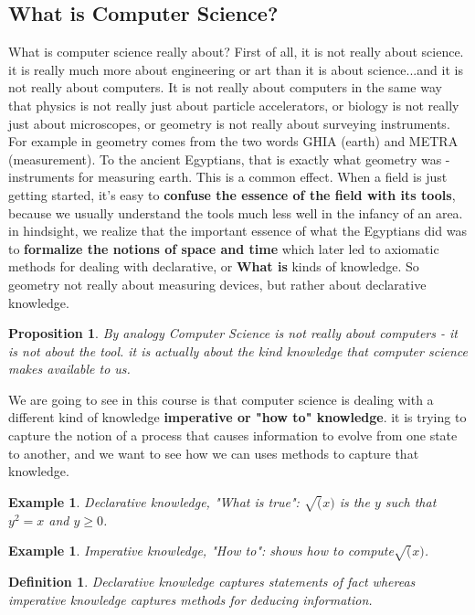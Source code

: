 \documentclass[a4paper,twoside]{article}
\newtheorem{proposition}[theorem]{Proposition}
\newtheorem{example}[theorem]{Example}
\newtheorem{definition}[theorem]{Definition}
\numberwithin{equation}{section}
\begin{document}
\subsection{What is Computer Science?}
\label{What is Computer Science?}
What is computer science really about? First of all, it is not really about science. it is really
much more about engineering or art than it is about science...and it is not really about computers.
It is not really about computers in the same way that physics is not really just about particle
accelerators, or biology is not really just about microscopes, or
geometry is not really about surveying instruments.
For example in geometry comes from the two words GHIA (earth) and METRA (measurement).
To the ancient Egyptians, that is exactly what geometry was - instruments for measuring earth.
This is a common effect. When a field is just getting started, it's easy to \textbf{confuse the
    essence of the field with its tools}, because we usually understand the tools much less well
in the infancy of an area. in hindsight, we realize that the
important essence of what the Egyptians did was to \textbf{formalize the notions of space and time}
which later led to axiomatic methods for dealing with declarative, or \textbf{What is} kinds of knowledge.
So geometry not really about measuring devices, but rather about declarative knowledge.
\begin{proposition}
    By analogy Computer Science is not really about computers - it is not about the tool. it is
    actually about the kind knowledge that computer science makes available to us.
\end{proposition}
We are going to see in this course is that computer science is dealing with a different kind of
knowledge \textbf{imperative or "how to" knowledge}. it is trying to capture the notion of a
process that causes information to evolve from one state to another, and we want to see how we can
uses methods to capture that knowledge.
\begin{example}
    Declarative knowledge, "What is true": $\sqrt(x)$ is the $y$ such that $y^2 = x$ and $y \geq 0 $.
\end{example}
\begin{example}
    Imperative knowledge, "How to": shows how to compute$\sqrt(x)$.
\end{example}
\begin{definition}
    Declarative knowledge captures statements of fact whereas imperative knowledge captures methods for deducing information.
\end{definition}
\end{document}
